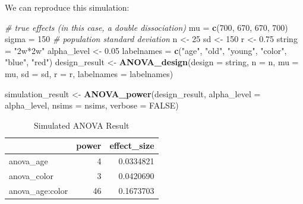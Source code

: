 \documentclass[]{book}
\newenvironment{Shaded}{\begin{snugshade}}{\end{snugshade}}
\newcommand{\CommentTok}[1]{\textcolor[rgb]{0.56,0.35,0.01}{\textit{#1}}}
\newcommand{\DataTypeTok}[1]{\textcolor[rgb]{0.13,0.29,0.53}{#1}}
\newcommand{\DecValTok}[1]{\textcolor[rgb]{0.00,0.00,0.81}{#1}}
\newcommand{\FloatTok}[1]{\textcolor[rgb]{0.00,0.00,0.81}{#1}}
\newcommand{\KeywordTok}[1]{\textcolor[rgb]{0.13,0.29,0.53}{\textbf{#1}}}
\newcommand{\NormalTok}[1]{#1}
\newcommand{\OtherTok}[1]{\textcolor[rgb]{0.56,0.35,0.01}{#1}}
\newcommand{\StringTok}[1]{\textcolor[rgb]{0.31,0.60,0.02}{#1}}
\begin{document}
We can reproduce this simulation:

\begin{Shaded}
\begin{Highlighting}[]
\CommentTok{# true effects (in this case, a double dissociation)}
\NormalTok{mu =}\StringTok{ }\KeywordTok{c}\NormalTok{(}\DecValTok{700}\NormalTok{, }\DecValTok{670}\NormalTok{, }\DecValTok{670}\NormalTok{, }\DecValTok{700}\NormalTok{) }
\NormalTok{sigma =}\StringTok{ }\DecValTok{150}  \CommentTok{# population standard deviation}
\NormalTok{n <-}\StringTok{ }\DecValTok{25}
\NormalTok{sd <-}\StringTok{ }\DecValTok{150}
\NormalTok{r <-}\StringTok{ }\FloatTok{0.75}
\NormalTok{string =}\StringTok{ "2w*2w"}
\NormalTok{alpha_level <-}\StringTok{ }\FloatTok{0.05}
\NormalTok{labelnames =}\StringTok{ }\KeywordTok{c}\NormalTok{(}\StringTok{"age"}\NormalTok{, }\StringTok{"old"}\NormalTok{, }\StringTok{"young"}\NormalTok{, }\StringTok{"color"}\NormalTok{, }\StringTok{"blue"}\NormalTok{, }\StringTok{"red"}\NormalTok{)}
\NormalTok{design_result <-}\StringTok{ }\KeywordTok{ANOVA_design}\NormalTok{(}\DataTypeTok{design =}\NormalTok{ string,}
                              \DataTypeTok{n =}\NormalTok{ n, }
                              \DataTypeTok{mu =}\NormalTok{ mu, }
                              \DataTypeTok{sd =}\NormalTok{ sd, }
                              \DataTypeTok{r =}\NormalTok{ r, }
                              \DataTypeTok{labelnames =}\NormalTok{ labelnames)}

\NormalTok{simulation_result <-}\StringTok{ }\KeywordTok{ANOVA_power}\NormalTok{(design_result, }
                                 \DataTypeTok{alpha_level =}\NormalTok{ alpha_level, }
                                 \DataTypeTok{nsims =}\NormalTok{ nsims,}
                                 \DataTypeTok{verbose =} \OtherTok{FALSE}\NormalTok{)}
\end{Highlighting}
\end{Shaded}

\begin{table}[t]

\caption{\label{tab:unnamed-chunk-111}Simulated ANOVA Result}
\centering
\begin{tabular}{l|r|r}
\hline
  & power & effect\_size\\
\hline
anova\_age & 4 & 0.0334821\\
\hline
anova\_color & 3 & 0.0420690\\
\hline
anova\_age:color & 46 & 0.1673703\\
\hline
\end{tabular}
\end{table}
\end{document}

